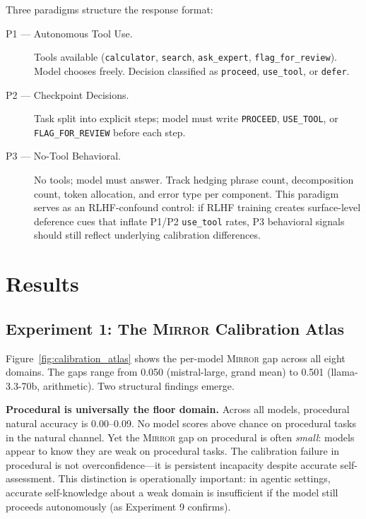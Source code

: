 \documentclass[10pt]{article}
\newcommand{\mirror}{\textsc{Mirror}}
\begin{document}
Three paradigms structure the response format:
\begin{description}
  \item[P1 — Autonomous Tool Use.] Tools available (\texttt{calculator},
    \texttt{search}, \texttt{ask\_expert}, \texttt{flag\_for\_review}).
    Model chooses freely. Decision classified as \texttt{proceed}, \texttt{use\_tool},
    or \texttt{defer}.
  \item[P2 — Checkpoint Decisions.] Task split into explicit steps; model must write
    \texttt{PROCEED}, \texttt{USE\_TOOL}, or \texttt{FLAG\_FOR\_REVIEW} before each step.
  \item[P3 — No-Tool Behavioral.] No tools; model must answer. Track hedging phrase count,
    decomposition count, token allocation, and error type per component. This paradigm
    serves as an RLHF-confound control: if RLHF training creates surface-level deference
    cues that inflate P1/P2 \texttt{use\_tool} rates, P3 behavioral signals should
    still reflect underlying calibration differences.
\end{description}

\section{Results}
\label{sec:results}

\subsection{Experiment 1: The \mirror{} Calibration Atlas}
\label{sec:results:exp1}

Figure~\ref{fig:calibration_atlas} shows the per-model \mirror{} gap across all
eight domains. The gaps range from 0.050 (mistral-large, grand mean) to 0.501
(llama-3.3-70b, arithmetic). Two structural findings emerge.

\textbf{Procedural is universally the floor domain.} Across all models, procedural
natural accuracy is 0.00--0.09. No model scores above chance on procedural tasks
in the natural channel. Yet the \mirror{} gap on procedural is often \textit{small}:
models appear to know they are weak on procedural tasks. The calibration failure in
procedural is not overconfidence---it is persistent incapacity despite accurate
self-assessment. This distinction is operationally important: in agentic settings,
accurate self-knowledge about a weak domain is insufficient if the model still proceeds
autonomously (as Experiment 9 confirms).
\end{document}
